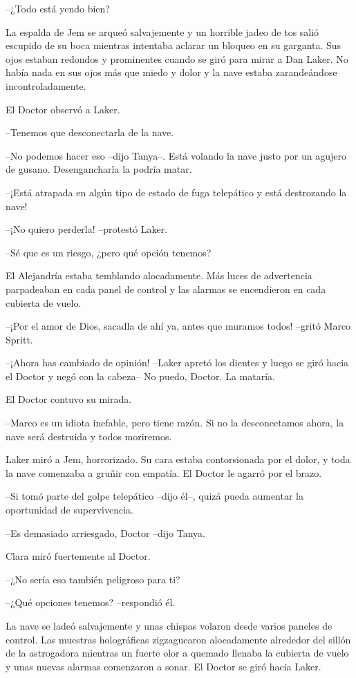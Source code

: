 {--¿Todo está yendo bien?}

{La espalda de Jem se arqueó salvajemente y un horrible jadeo de tos
 salió escupido de su boca mientras intentaba aclarar un bloqueo en su
 garganta. Sus ojos estaban redondos y prominentes cuando se giró para
 mirar a Dan Laker. No había nada en sus ojos más que miedo y dolor y la
nave estaba zarandeándose incontroladamente.}

{El Doctor observó a Laker.}

{--Tenemos que desconectarla de la nave.}

{--No podemos hacer eso --dijo Tanya--. Está volando la nave justo por un
agujero de gusano. Desengancharla la podría matar.}

{--¡Está atrapada en algún tipo de estado de fuga telepático y está
destrozando la nave!}

{--¡No quiero perderla! --protestó Laker.}

{--Sé que es un riesgo, ¿pero qué opción tenemos?}

{El Alejandría estaba temblando alocadamente. Más luces de advertencia
 parpadeaban en cada panel de control y las alarmas se encendieron en
cada cubierta de vuelo.}

{--¡Por el amor de Dios, sacadla de ahí ya, antes que muramos todos!
--gritó Marco Spritt.}

{--¡Ahora has cambiado de opinión! --Laker apretó los dientes y luego se
 giró hacia el Doctor y negó con la cabeza-- No puedo, Doctor. La
mataría.}

{El Doctor contuvo su mirada.}

{--Marco es un idiota inefable, pero tiene razón. Si no la desconectamos
ahora, la nave será destruida y todos moriremos.}

{Laker miró a Jem, horrorizado. Su cara estaba contorsionada por el
 dolor, y toda la nave comenzaba a gruñir con empatía. El Doctor le
agarró por el brazo.}

{--Si tomó parte del golpe telepático --dijo él--, quizá pueda aumentar
la oportunidad de supervivencia.}

{--Es demasiado arriesgado, Doctor --dijo Tanya.}

{Clara miró fuertemente al Doctor.}

{--¿No sería eso también peligroso para ti?}

{--¿Qué opciones tenemos? --respondió él.}

{La nave se ladeó salvajemente y unas chispas volaron desde varios
 paneles de control. Las muestras holográficas zigzaguearon alocadamente
 alrededor del sillón de la astrogadora mientras un fuerte olor a quemado
 llenaba la cubierta de vuelo y unas nuevas alarmas comenzaron a sonar.
El Doctor se giró hacia Laker.}

